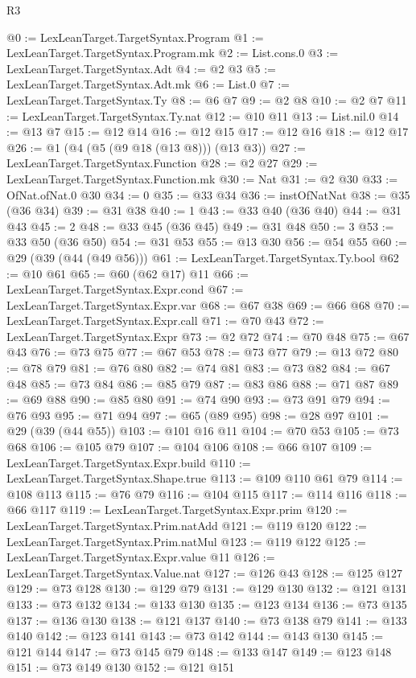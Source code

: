 \begin{lexlean}{R3}
\begin{coremodule}
@0 := LexLeanTarget.TargetSyntax.Program
@1 := LexLeanTarget.TargetSyntax.Program.mk
@2 := List.cons.{0}
@3 := LexLeanTarget.TargetSyntax.Adt
@4 := @2 @3
@5 := LexLeanTarget.TargetSyntax.Adt.mk
@6 := List.{0}
@7 := LexLeanTarget.TargetSyntax.Ty
@8 := @6 @7
@9 := @2 @8
@10 := @2 @7
@11 := LexLeanTarget.TargetSyntax.Ty.nat
@12 := @10 @11
@13 := List.nil.{0}
@14 := @13 @7
@15 := @12 @14
@16 := @12 @15
@17 := @12 @16
@18 := @12 @17
@26 := @1 (@4 (@5 (@9 @18 (@13 @8))) (@13 @3))
@27 := LexLeanTarget.TargetSyntax.Function
@28 := @2 @27
@29 := LexLeanTarget.TargetSyntax.Function.mk
@30 := Nat
@31 := @2 @30
@33 := OfNat.ofNat.{0} @30
@34 := 0
@35 := @33 @34
@36 := instOfNatNat
@38 := @35 (@36 @34)
@39 := @31 @38
@40 := 1
@43 := @33 @40 (@36 @40)
@44 := @31 @43
@45 := 2
@48 := @33 @45 (@36 @45)
@49 := @31 @48
@50 := 3
@53 := @33 @50 (@36 @50)
@54 := @31 @53
@55 := @13 @30
@56 := @54 @55
@60 := @29 (@39 (@44 (@49 @56)))
@61 := LexLeanTarget.TargetSyntax.Ty.bool
@62 := @10 @61
@65 := @60 (@62 @17) @11
@66 := LexLeanTarget.TargetSyntax.Expr.cond
@67 := LexLeanTarget.TargetSyntax.Expr.var
@68 := @67 @38
@69 := @66 @68
@70 := LexLeanTarget.TargetSyntax.Expr.call
@71 := @70 @43
@72 := LexLeanTarget.TargetSyntax.Expr
@73 := @2 @72
@74 := @70 @48
@75 := @67 @43
@76 := @73 @75
@77 := @67 @53
@78 := @73 @77
@79 := @13 @72
@80 := @78 @79
@81 := @76 @80
@82 := @74 @81
@83 := @73 @82
@84 := @67 @48
@85 := @73 @84
@86 := @85 @79
@87 := @83 @86
@88 := @71 @87
@89 := @69 @88
@90 := @85 @80
@91 := @74 @90
@93 := @73 @91 @79
@94 := @76 @93
@95 := @71 @94
@97 := @65 (@89 @95)
@98 := @28 @97
@101 := @29 (@39 (@44 @55))
@103 := @101 @16 @11
@104 := @70 @53
@105 := @73 @68
@106 := @105 @79
@107 := @104 @106
@108 := @66 @107
@109 := LexLeanTarget.TargetSyntax.Expr.build
@110 := LexLeanTarget.TargetSyntax.Shape.true
@113 := @109 @110 @61 @79
@114 := @108 @113
@115 := @76 @79
@116 := @104 @115
@117 := @114 @116
@118 := @66 @117
@119 := LexLeanTarget.TargetSyntax.Expr.prim
@120 := LexLeanTarget.TargetSyntax.Prim.natAdd
@121 := @119 @120
@122 := LexLeanTarget.TargetSyntax.Prim.natMul
@123 := @119 @122
@125 := LexLeanTarget.TargetSyntax.Expr.value @11
@126 := LexLeanTarget.TargetSyntax.Value.nat
@127 := @126 @43
@128 := @125 @127
@129 := @73 @128
@130 := @129 @79
@131 := @129 @130
@132 := @121 @131
@133 := @73 @132
@134 := @133 @130
@135 := @123 @134
@136 := @73 @135
@137 := @136 @130
@138 := @121 @137
@140 := @73 @138 @79
@141 := @133 @140
@142 := @123 @141
@143 := @73 @142
@144 := @143 @130
@145 := @121 @144
@147 := @73 @145 @79
@148 := @133 @147
@149 := @123 @148
@151 := @73 @149 @130
@152 := @121 @151

\end{coremodule}
\end{lexlean}
